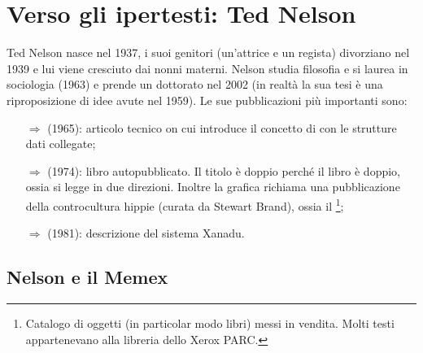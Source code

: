 
\section{Verso gli ipertesti: Ted Nelson}

Ted Nelson nasce nel 1937, i suoi genitori (un'attrice e un regista) divorziano nel 1939 e lui viene cresciuto dai nonni
materni. Nelson studia filosofia e si laurea in sociologia (1963) e prende un dottorato nel 
2002 (in realtà la sua tesi è una riproposizione di idee avute nel 1959).
Le sue pubblicazioni più importanti sono:

\begin{itemize}
    \item [$\Rightarrow$]  (1965): 
    articolo tecnico on cui introduce il concetto di  con le strutture dati collegate;
    \item [$\Rightarrow$]  (1974): libro autopubblicato.
    Il titolo è doppio perché il libro è doppio, ossia si legge in due direzioni.
    Inoltre la grafica richiama una pubblicazione della controcultura hippie (curata da Stewart Brand),
    ossia il \footnote{Catalogo di oggetti (in particolar modo libri)
    messi in vendita. Molti testi appartenevano alla libreria dello Xerox PARC.};
    \item [$\Rightarrow$]  (1981): descrizione del sistema Xanadu.
\end{itemize}



\subsection{Nelson e il Memex}


